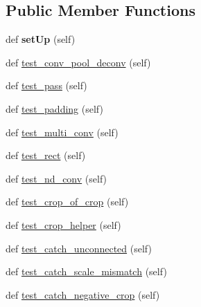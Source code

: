 \subsection*{Public Member Functions}
\begin{DoxyCompactItemize}
\item 
\mbox{\label{classtest__coord__map_1_1_test_coord_map_af66332a44771ca96c793202f1dac5b37}} 
def {\bfseries set\+Up} (self)
\item 
def \mbox{\hyperlink{classtest__coord__map_1_1_test_coord_map_aed9736fb0b6b15ad1c1762026bd48d23}{test\+\_\+conv\+\_\+pool\+\_\+deconv}} (self)
\item 
def \mbox{\hyperlink{classtest__coord__map_1_1_test_coord_map_a2f0683f7bed6336b447db17df3402ba1}{test\+\_\+pass}} (self)
\item 
def \mbox{\hyperlink{classtest__coord__map_1_1_test_coord_map_a05e323174f0281214985c9fc25109bae}{test\+\_\+padding}} (self)
\item 
def \mbox{\hyperlink{classtest__coord__map_1_1_test_coord_map_a8c24c043c0387417c3ad38662a22c170}{test\+\_\+multi\+\_\+conv}} (self)
\item 
def \mbox{\hyperlink{classtest__coord__map_1_1_test_coord_map_a8af3000e67e91408dcc1957e49f8490b}{test\+\_\+rect}} (self)
\item 
def \mbox{\hyperlink{classtest__coord__map_1_1_test_coord_map_a82d99d2dc04f75b4531b7e93afe3bdee}{test\+\_\+nd\+\_\+conv}} (self)
\item 
def \mbox{\hyperlink{classtest__coord__map_1_1_test_coord_map_ab8a01dfdd9827ff8394176577bc1ffd8}{test\+\_\+crop\+\_\+of\+\_\+crop}} (self)
\item 
def \mbox{\hyperlink{classtest__coord__map_1_1_test_coord_map_a2dbc76e0e6d0fde7490d8e986a5f6f79}{test\+\_\+crop\+\_\+helper}} (self)
\item 
def \mbox{\hyperlink{classtest__coord__map_1_1_test_coord_map_abe829be781dd8870d41c124b3b7eb976}{test\+\_\+catch\+\_\+unconnected}} (self)
\item 
def \mbox{\hyperlink{classtest__coord__map_1_1_test_coord_map_a08e81688b38d5c40d850ca6c58a68754}{test\+\_\+catch\+\_\+scale\+\_\+mismatch}} (self)
\item 
def \mbox{\hyperlink{classtest__coord__map_1_1_test_coord_map_af89585816f46e734aa5ed25a4dc8e291}{test\+\_\+catch\+\_\+negative\+\_\+crop}} (self)
\end{DoxyCompactItemize}


